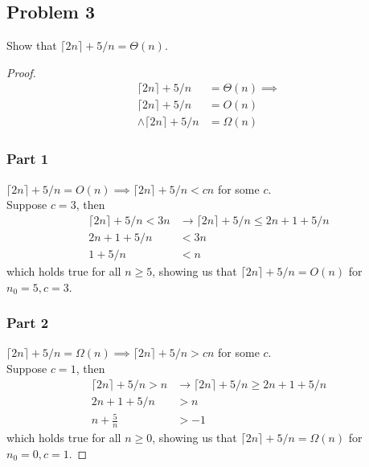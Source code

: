 \documentclass{article}
\begin{document}
\subsection*{Problem 3}
Show that \(\lceil 2n \rceil + 5/n = \Theta(n)\).
\begin{proof}
    \begin{align*}
        \lceil 2n \rceil + 5/n       & = \Theta(n) \implies \\
        \lceil 2n \rceil + 5/n       & = O(n)               \\
        \land \lceil 2n \rceil + 5/n & = \Omega(n)
    \end{align*}
    \subsubsection*{Part 1}
    \(\lceil 2n \rceil + 5/n = O(n) \implies \lceil 2n \rceil + 5/n < cn\) for some \(c\). \\
    Suppose \(c = 3\), then
    \begin{align*}
        \lceil 2n \rceil + 5/n < 3n & \rightarrow \lceil 2n \rceil + 5/n \leq 2n + 1 + 5/n \\
        2n + 1 + 5/n                & < 3n                                                 \\
        1 + 5/n                     & < n
    \end{align*}
    which holds true for all \(n \geq 5\), showing us that \(\lceil 2n \rceil + 5/n = O(n)\) for \(n_0 = 5, c=3\).
    \subsubsection*{Part 2}
    \(\lceil 2n \rceil + 5/n = \Omega(n) \implies \lceil 2n \rceil + 5/n > cn\) for some \(c\). \\
    Suppose \(c = 1\), then
    \begin{align*}
        \lceil 2n \rceil + 5/n > n & \rightarrow \lceil 2n \rceil + 5/n \geq 2n + 1 + 5/n \\
        2n + 1 + 5/n               & > n                                                  \\
        n + \frac{5}{n}            & > -1
    \end{align*}
    which holds true for all \(n \geq 0\), showing us that \(\lceil 2n \rceil + 5/n = \Omega(n)\) for \(n_0 = 0, c=1\).
\end{proof}
\end{document}
